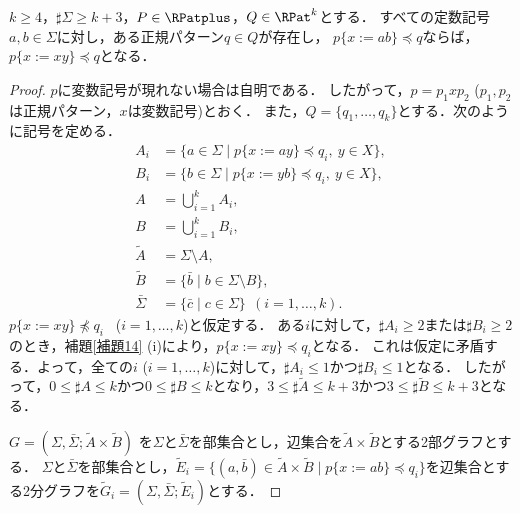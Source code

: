 
\begin{lem}\label{追加補題1}
$k \ge 4$，$\sharp \Sigma \ge k+3$，$P \in \RPatplus$，$Q \in \RPat^{k}$とする．
すべての定数記号$a, b \in \Sigma$に対し，ある正規パターン$q \in Q$が存在し，
$p \{ x:=ab \} \preceq q$ならば，$p \{ x:=xy \} \preceq q$となる．
\end{lem}
\begin{proof}
$p$に変数記号が現れない場合は自明である．
したがって，$p=p_{1}xp_{2}$ ($p_{1},p_{2}$は正規パターン，$x$は変数記号)とおく．
また，$Q=\{ q_{1}, \ldots , q_{k} \}$とする．次のように記号を定める．
\begin{align*}
A_{i} & = \{ a \in \Sigma \mid p \{ x:=ay \} \preceq q_{i},\ y\in X\},\\ 
B_{i} & = \{ b \in \Sigma \mid p \{ x:=yb \} \preceq q_{i},\ y\in X\},\\ 
A & = \bigcup_{i=1}^{k}A_{i},\\
B & = \bigcup_{i=1}^{k}B_{i},\\
\tilde{A} & = \Sigma\setminus A,\\
\tilde{B} & = \{ \bar{b} \mid b \in \Sigma \setminus B \},\\
\bar{\Sigma} & = \{ \bar{c} \mid c \in \Sigma \}~~(i=1, \ldots , k).
\end{align*}
$p \{ x:=xy \} \not \preceq q_{i}$ \ ($i=1, \ldots , k$)と仮定する．
ある$i$に対して，$\sharp A_{i} \ge 2$または$\sharp B_{i} \ge 2$のとき，補題\ref{補題14} (i)により，$p \{ x:=xy \} \preceq q_{i}$となる．
これは仮定に矛盾する．よって，全ての$i$ ($i=1, \ldots , k$)に対して，$\sharp A_{i} \le 1$かつ$\sharp B_{i} \le 1$となる．
したがって，$0 \le \sharp A \le k$かつ$0 \le \sharp B \le k$となり，$3 \le \sharp \tilde{A} \le k+3$かつ$3 \le \sharp \tilde{B} \le k+3$となる．

$G=(\Sigma,\bar{\Sigma}; \tilde{A} \times \tilde{B})$
を$\Sigma$と$\bar{\Sigma}$を部集合とし，辺集合を$\tilde{A} \times \tilde{B}$とする2部グラフとする．
$\Sigma$と$\bar{\Sigma}$を部集合とし，$\tilde{E}_{i}=\{ (a, \bar{b}) \in \tilde{A} \times \tilde{B} \mid p \{ x:=ab \} \preceq q_{i} \}$を辺集合とする2分グラフを$\tilde{G}_{i}=(\Sigma,\bar{\Sigma}; \tilde{E}_{i})$とする．


\end{proof}
